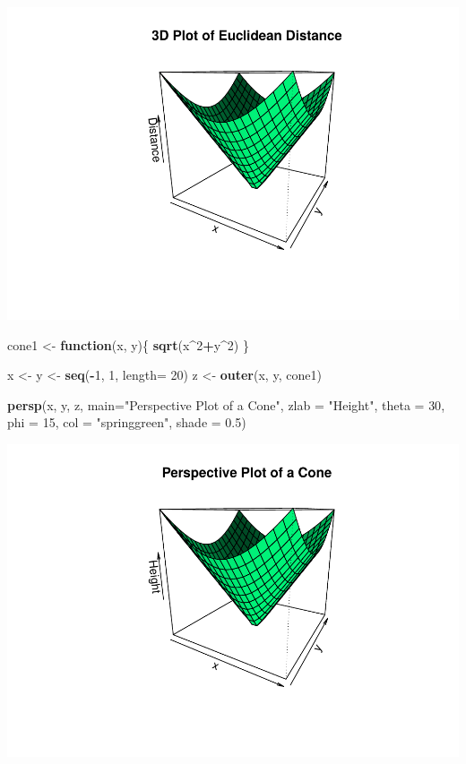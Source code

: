 \documentclass[
]{article}
\newenvironment{Shaded}{\begin{snugshade}}{\end{snugshade}}
\newcommand{\AttributeTok}[1]{\textcolor[rgb]{0.13,0.29,0.53}{#1}}
\newcommand{\ControlFlowTok}[1]{\textcolor[rgb]{0.13,0.29,0.53}{\textbf{#1}}}
\newcommand{\DecValTok}[1]{\textcolor[rgb]{0.00,0.00,0.81}{#1}}
\newcommand{\FloatTok}[1]{\textcolor[rgb]{0.00,0.00,0.81}{#1}}
\newcommand{\FunctionTok}[1]{\textcolor[rgb]{0.13,0.29,0.53}{\textbf{#1}}}
\newcommand{\NormalTok}[1]{#1}
\newcommand{\OtherTok}[1]{\textcolor[rgb]{0.56,0.35,0.01}{#1}}
\newcommand{\SpecialCharTok}[1]{\textcolor[rgb]{0.81,0.36,0.00}{\textbf{#1}}}
\newcommand{\StringTok}[1]{\textcolor[rgb]{0.31,0.60,0.02}{#1}}
\begin{document}
\includegraphics{week1_files/figure-latex/unnamed-chunk-1-1.pdf}

\begin{Shaded}
\begin{Highlighting}[]
\NormalTok{cone1 }\OtherTok{\textless{}{-}} \ControlFlowTok{function}\NormalTok{(x, y)\{}
\FunctionTok{sqrt}\NormalTok{(x}\SpecialCharTok{\^{}}\DecValTok{2}\SpecialCharTok{+}\NormalTok{y}\SpecialCharTok{\^{}}\DecValTok{2}\NormalTok{)}
\NormalTok{\}}

\NormalTok{x }\OtherTok{\textless{}{-}}\NormalTok{ y }\OtherTok{\textless{}{-}} \FunctionTok{seq}\NormalTok{(}\SpecialCharTok{{-}}\DecValTok{1}\NormalTok{, }\DecValTok{1}\NormalTok{, }\AttributeTok{length=} \DecValTok{20}\NormalTok{)}
\NormalTok{z }\OtherTok{\textless{}{-}} \FunctionTok{outer}\NormalTok{(x, y, cone1)}

\FunctionTok{persp}\NormalTok{(x, y, z,}
\AttributeTok{main=}\StringTok{"Perspective Plot of a Cone"}\NormalTok{,}
\AttributeTok{zlab =} \StringTok{"Height"}\NormalTok{,}
\AttributeTok{theta =} \DecValTok{30}\NormalTok{, }\AttributeTok{phi =} \DecValTok{15}\NormalTok{,}
\AttributeTok{col =} \StringTok{"springgreen"}\NormalTok{, }\AttributeTok{shade =} \FloatTok{0.5}\NormalTok{)}
\end{Highlighting}
\end{Shaded}

\includegraphics{week1_files/figure-latex/unnamed-chunk-2-1.pdf}
\end{document}
